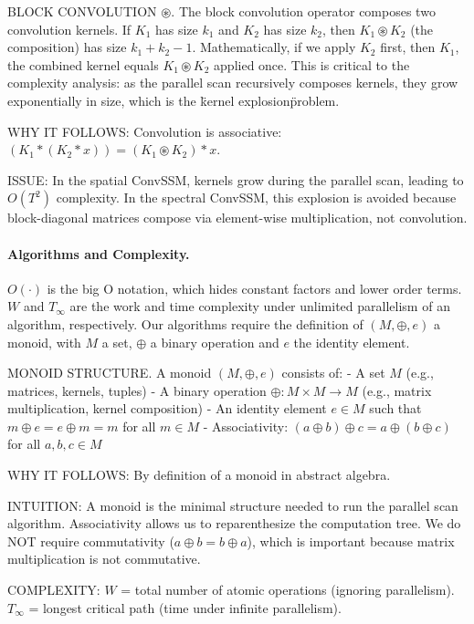 \documentclass{article}
\begin{document}
\begin{thomasbox}
BLOCK CONVOLUTION $\circledast$. The block convolution operator composes two convolution kernels. If $K_1$ has size $k_1$ and $K_2$ has size $k_2$, then $K_1 \circledast K_2$ (the composition) has size $k_1 + k_2 - 1$. Mathematically, if we apply $K_2$ first, then $K_1$, the combined kernel equals $K_1 \circledast K_2$ applied once. This is critical to the complexity analysis: as the parallel scan recursively composes kernels, they grow exponentially in size, which is the \"kernel explosion\" problem.

WHY IT FOLLOWS: Convolution is associative: $(K_1 \ast (K_2 \ast x)) = (K_1 \circledast K_2) \ast x$.

ISSUE: In the spatial ConvSSM, kernels grow during the parallel scan, leading to $O(T^2)$ complexity. In the spectral ConvSSM, this explosion is avoided because block-diagonal matrices compose via element-wise multiplication, not convolution.
\end{thomasbox}

\paragraph{Algorithms and Complexity.} $O(\cdot)$ is the big O notation, which hides constant factors and lower order terms. $W$ and $T_\infty$ are the work and time complexity under unlimited parallelism of an algorithm, respectively. Our algorithms require the definition of $(M, \oplus, e)$ a monoid, with $M$ a set, $\oplus$ a binary operation and $e$ the identity element.

\begin{thomasbox}
MONOID STRUCTURE. A monoid $(M, \oplus, e)$ consists of:
- A set $M$ (e.g., matrices, kernels, tuples)
- A binary operation $\oplus : M \times M \to M$ (e.g., matrix multiplication, kernel composition)
- An identity element $e \in M$ such that $m \oplus e = e \oplus m = m$ for all $m \in M$
- Associativity: $(a \oplus b) \oplus c = a \oplus (b \oplus c)$ for all $a, b, c \in M$

WHY IT FOLLOWS: By definition of a monoid in abstract algebra.

INTUITION: A monoid is the minimal structure needed to run the parallel scan algorithm. Associativity allows us to reparenthesize the computation tree. We do NOT require commutativity ($a \oplus b = b \oplus a$), which is important because matrix multiplication is not commutative.

COMPLEXITY: $W$ = total number of atomic operations (ignoring parallelism). $T_\infty$ = longest critical path (time under infinite parallelism).
\end{thomasbox}
\end{document}
